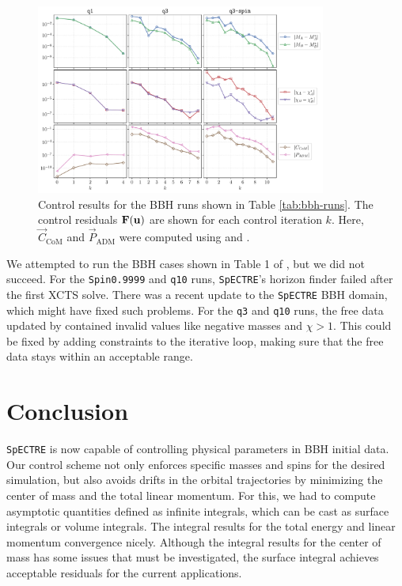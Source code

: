 \documentclass{../document}
\begin{document}
      \begin{figure}
        \centering
        \includegraphics[width=0.85\textwidth]{../../plots/final_report/control_iterations.pdf}
        \caption{Control results for the BBH runs shown in Table \ref{tab:bbh-runs}. The control residuals ${\bf F}({\bf u})$ are shown for each control iteration $k$. Here, $\vec C_\text{CoM}$ and $\vec P_\text{ADM}$ were computed using \eq{\eqref{eq:CoM-surf-1}} and \eq{\eqref{eq:Padm-surf}}.}
        \label{fig:control_iterations}
      \end{figure}

      We attempted to run the BBH cases shown in Table 1 of \cite{Serguei}, but we did not succeed. For the {\tt Spin0.9999} and {\tt q10} runs, {\tt SpECTRE}'s horizon finder failed after the first XCTS solve. There was a recent update to the {\tt SpECTRE} BBH domain, which might have fixed such problems. For the {\tt q3} and {\tt q10} runs, the free data updated by \eq{\eqref{eq:u-iteration}} contained invalid values like negative masses and $\chi > 1$. This could be fixed by adding constraints to the iterative loop, making sure that the free data stays within an acceptable range.

  \section{Conclusion}

    {\tt SpECTRE} is now capable of controlling physical parameters in BBH initial data. Our control scheme not only enforces specific masses and spins for the desired simulation, but also avoids drifts in the orbital trajectories by minimizing the center of mass and the total linear momentum. For this, we had to compute asymptotic quantities defined as infinite integrals, which can be cast as surface integrals or volume integrals. The integral results for the total energy and linear momentum convergence nicely. Although the integral results for the center of mass has some issues that must be investigated, the surface integral achieves acceptable residuals for the current applications.
\end{document}
